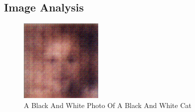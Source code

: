 \documentclass{article}%
\begin{document}
%
\subsection{Image Analysis}%
\label{subsec:ImageAnalysis}%


\begin{figure}[h!]%
\centering%
\includegraphics[width=150px]{500_fake_images/samples_5_409.png}%
\caption{A Black And White Photo Of A Black And White Cat}%
\end{figure}

%
\end{document}
